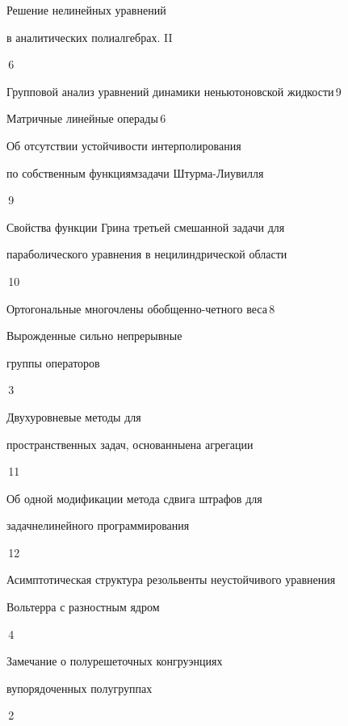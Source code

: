 {Решение нелинейных уравнений 


в аналитических полиалгебрах. II\ }{\No\,6}




{Групповой анализ уравнений динамики неньютоновской жидкости}{\No\,9}




{Матричные линейные операды}{\No\,6}




{Об отсутствии устойчивости интерполирования


по собственным функциям\newline задачи Штурма-Лиувилля}{\No\,9}




{Свойства функции Грина третьей смешанной задачи для\newline


параболического уравнения в нецилиндрической области}{\No\,10}




{Ортогональные многочлены обобщенно-четного веса}{\No\,8}




{Вырожденные сильно непрерывные


группы операторов}{\No\,3}




{Двухуровневые методы для


пространственных задач, основанные\newline на агрегации}{\No\,11}




{Об одной модификации метода сдвига штрафов для 


задач\newline нелинейного программирования}{\No\,12}




{Асимптотическая структура резольвенты неустойчивого уравнения \newline


Вольтерра с разностным ядром}{\No\,4}




{Замечание о полурешеточных конгруэнциях


в\newline упорядоченных полугруппах}{\No\,2}


